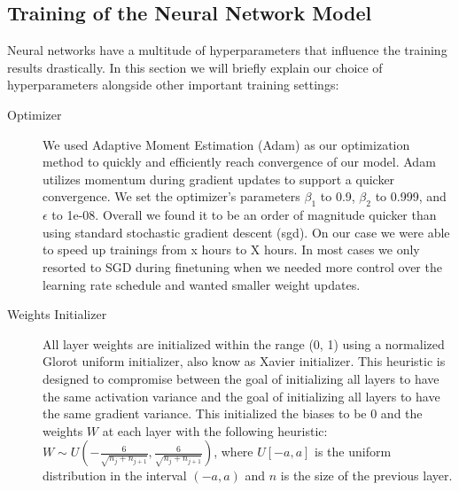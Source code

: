 \subsection{Training of the Neural Network Model} 
\label{sec:training}
	Neural networks have a multitude of hyperparameters that influence the training results drastically. In this section we will briefly explain our choice of hyperparameters alongside other important training settings:

	\begin{description}
	\item[Optimizer] We used Adaptive Moment Estimation (Adam)\cite{kingma2014adam} as our optimization method to quickly and efficiently reach convergence of our model. Adam utilizes momentum during gradient updates to support a quicker convergence. We set the optimizer's parameters $\beta_1$ to 0.9, $\beta_2$ to 0.999, and $\epsilon$ to 1e-08. Overall we found it to be an order of magnitude quicker than using standard stochastic gradient descent (\ac{sgd}). On our case we were able to speed up trainings from x hours to X hours. In most cases we only resorted to SGD during finetuning when we needed more control over the learning rate schedule and wanted smaller weight updates.
	\item[Weights Initializer] All layer weights are initialized within the range (0, 1) using a normalized Glorot uniform initializer\cite{glorot2010understanding}, also know as Xavier initializer. This heuristic is designed to compromise between the goal of initializing all layers to have the same activation variance and the goal of initializing all layers to have the same gradient variance. This initialized the biases to be 0 and the weights $W$ at each layer with the following heuristic\cite[chapter 8.4, p. 303]{Goodfellow-et-al-2016}: $W \sim U (-\frac{6}{\sqrt{n_j + n_{j+1}}}, \frac{6}{\sqrt{n_j + n_{j+1}}})$, where $U[-a, a]$ is the uniform distribution in the interval $(-a, a)$ and $n$ is the size of the previous layer.
	

\end{description}
